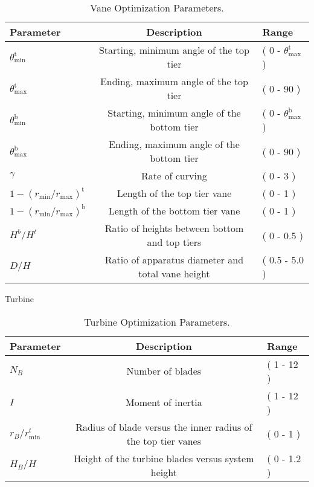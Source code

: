 %
%
\large
\begin{center}
\begin{table}[h]
 \centering
  \begin{tabular}{| l | c | l |}
    \hline
    Parameter & Description & Range \\
    \hline
    $\theta^{\text{t}}_{\text{min}}$ & Starting, minimum angle of the
       top tier & ( 0 - $\theta^{\text{t}}_{\text{max}}$ ) \\
    $\theta^{\text{t}}_{\text{max}}$ & Ending, maximum angle of the top
       tier & ( 0 - 90 ) \\
    $\theta^{\text{b}}_{\text{min}}$ & Starting, minimum angle of the
       bottom tier & ( 0 - $\theta^{\text{b}}_{\text{max}}$ ) \\
    $\theta^{\text{b}}_{\text{max}}$ & Ending, maximum angle of the
       bottom tier & ( 0 - 90 ) \\
   $\gamma$ & Rate of curving & ( 0 - 3 ) \\
   $1 - (r_{\text{min}} / r_{\text{max}})^{\text{t}}$ & Length of the top
       tier vane & ( 0 - 1 ) \\
   $1 - (r_{\text{min}} / r_{\text{max}})^{\text{b}}$ & Length of the bottom
       tier vane & ( 0 - 1 ) \\
   $H^b/H^t$ & Ratio of heights between bottom and top tiers & ( 0 -
	   0.5 ) \\ 
   $D/H$ & Ratio of apparatus diameter and total vane height & ( 0.5 -
	   5.0 ) \\ 
    \hline
  \end{tabular}
  \caption{Vane Optimization Parameters.}
  \label{tab:vane}
\end{table}
\end{center}
\normalsize

Turbine

%
%
\large
\begin{center}
\begin{table}[h]
 \centering
  \begin{tabular}{| l | c | l |}
    \hline
    Parameter & Description & Range \\
    \hline
    $N_B$ & Number of blades & ( 1 - 12 ) \\
    $I$ & Moment of inertia & ( 1 - 12 ) \\
    $r_B/r_{\text{min}}^t$ & Radius of blade versus the inner radius of
       the top tier vanes & ( 0 - 1 ) \\
   $H_B/H$ & Height of the turbine blades versus system height & ( 0 - 1.2 ) \\
    \hline
  \end{tabular}
  \caption{Turbine Optimization Parameters.}
  \label{tab:turbine}
\end{table}
\end{center}
\normalsize

